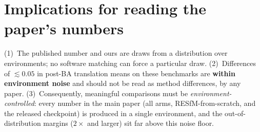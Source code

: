 \documentclass[10pt,twocolumn,letterpaper]{article}
\begin{document}
\section{Implications for reading the paper's numbers}\label{sec:implications}
(1)~The published number and ours are draws from a distribution over environments; no
software matching can force a particular draw. (2)~Differences of $\lesssim\!0.05$ in
post-BA translation means on these benchmarks are \textbf{within environment noise} and
should not be read as method differences, by any paper. (3)~Consequently, meaningful
comparisons must be \emph{environment-controlled}: every number in the main paper
(all arms, RESfM-from-scratch, and the released checkpoint) is produced in a single
environment, and the out-of-distribution margins ($2\times$ and larger) sit far above this
noise floor.
\end{document}
